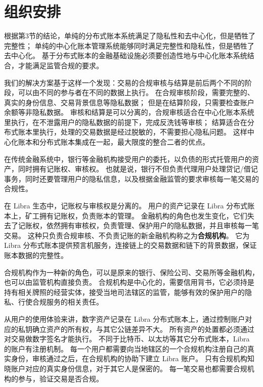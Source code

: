 \section{组织安排}\label{sec:arrangement}
根据第3节的结论，单纯的分布式账本系统满足了隐私性和去中心化，但是牺牲了完整性；
单纯的中心化账本管理系统能够同时满足完整性和隐私性，但是牺牲了去中心化。
基于分布式账本的金融基础设施必须要创造性地与中心化账本系统结合，才能满足监管合规的要求。

我们的解决方案基于这样一个发现：交易的合规审核与结算是前后两个不同的阶段，可以由不同的参与者在不同的数据上执行。
在合规审核阶段，需要完整的、真实的身份信息、交易背景信息等隐私数据；
但是在结算阶段，只需要检查账户余额等非隐私数据。
审核和结算是可以分离的，合规审核适合在中心化账本系统里执行，在不泄露用户的隐私数据的前提下，完成反洗钱等审核；
结算适合在分布式账本里执行，处理的交易数据是经过脱敏的，不需要担心隐私问题。
这样中心化账本和分布式账本集成在一起，最大限度的整合二者的优点。


在传统金融系统中，银行等金融机构接受用户的委托，以负债的形式托管用户的资产，同时拥有记账权、审核权。
也就是说，银行不但负责代理用户处理贷记/借记事务，同时还要管理用户的隐私信息，以及根据金融监管的要求审核每一笔交易的合规性。

在 Libra 生态中，记账权与审核权是分离的。
用户的资产记录在 Libra 分布式账本上，矿工拥有记账权，负责账本的管理。
金融机构的角色也发生变化，它们失去了记账权，依然拥有审核权，负责管理、保护用户的隐私数据，并且审核每一笔交易。
这种只负责合规审核、不负责记账的新金融机构称之为\textbf{合规机构}。
它为 Libra 分布式账本提供预言机服务，连接链上的交易数据和链下的背景数据，保证账本数据的完整性。

合规机构作为一种新的角色，可以是原来的银行、保险公司、交易所等金融机构，也可以由监管机构直接负责。
合规机构是中心化的，需要信用背书，它必须持是持有相关牌照的经营实体，接受当地司法辖区的监管，能够有效的保护用户的隐私、行使合规服务的相关责任。

从用户的使用体验来讲，数字资产记录在 Libra 分布式账本上，通过控制账户对应的私钥确立资产的所有权，与其它公链差异不大。
所有资产的处置都必须通过对交易做数字签名才能执行。
不同于比特币、以太坊等其它分布式账本，Libra 的账户有注册机制。
每一个用户都需要向当地辖区的一个合规机构注册自己的真实身份，审核通过之后，在合规机构的协助下建立 Libra 账户。
只有合规机构知晓账户对应的真实身份信息，对于其它人是保密的。
每一笔交易也都需要合规机构的参与，验证交易是否合规。

